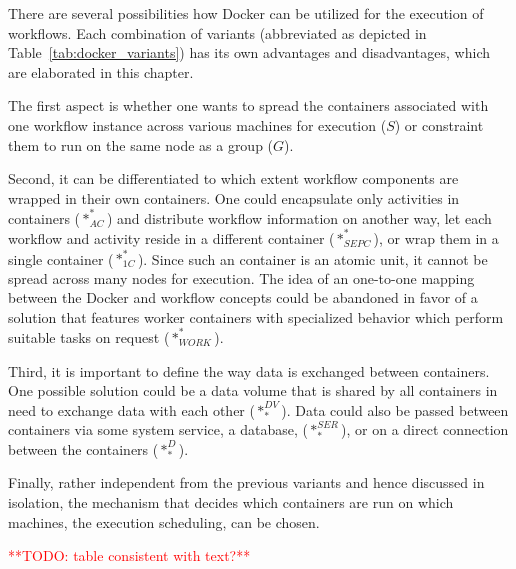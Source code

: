 
There are several possibilities how Docker can be utilized for the execution of workflows.
Each combination of variants (abbreviated as depicted in Table~\ref{tab:docker_variants}) has its own advantages and disadvantages, which are elaborated in this chapter.

The first aspect is whether one wants to spread the containers associated with one workflow instance across various machines for execution ($S$) or constraint them to run on the same node as a group ($G$).

Second, it can be differentiated to which extent workflow components are wrapped in their own containers.
One could encapsulate only activities in containers ($*_{AC}^{*}$) and distribute workflow information on another way, let each workflow and activity reside in a different container ($*_{SEPC}^{*}$), or wrap them in a single container ($*_{1C}^{*}$). Since such an container is an atomic unit, it cannot be spread across many nodes for execution. The idea of an one-to-one mapping between the Docker and workflow concepts could be abandoned in favor of a solution that features worker containers with specialized behavior which perform suitable tasks on request ($*_{WORK}^{*}$).

Third, it is important to define the way data is exchanged between containers. One possible solution could be a data volume that is shared by all containers in need to exchange data with each other ($*_{*}^{DV}$). Data could also be passed between containers via some system service, \eg a database, ($*_{*}^{SER}$), or on a direct connection between the containers ($*_{*}^{D}$).

Finally, rather independent from the previous variants and hence discussed in isolation, the mechanism that decides which containers are run on which machines, \ie the execution scheduling, can be chosen.

\textcolor{red}{**TODO: table consistent with text?**}

